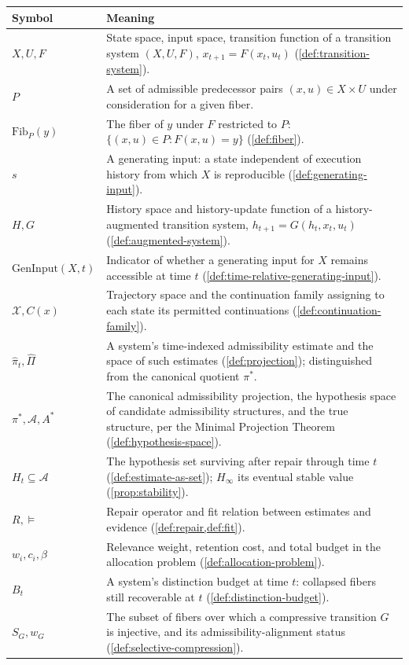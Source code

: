 \documentclass[11pt]{book}
\theoremstyle{plain}
\theoremstyle{definition}
\theoremstyle{remark}
\begin{document}
\begin{center}
\renewcommand{\arraystretch}{1.3}
\begin{tabular}{p{2.6cm}p{9.2cm}}
\toprule
\textbf{Symbol} & \textbf{Meaning} \\
\midrule
$X, U, F$ & State space, input space, transition function of a
transition system $(X,U,F)$, $x_{t+1} = F(x_t,u_t)$
(\cref{def:transition-system}). \\
$P$ & A set of admissible predecessor pairs $(x,u) \in X \times U$
under consideration for a given fiber. \\
$\mathrm{Fib}_P(y)$ & The fiber of $y$ under $F$ restricted to $P$:
$\{(x,u) \in P : F(x,u) = y\}$ (\cref{def:fiber}). \\
$s$ & A generating input: a state independent of execution history
from which $X$ is reproducible (\cref{def:generating-input}). \\
$H, G$ & History space and history-update function of a
history-augmented transition system, $h_{t+1} = G(h_t,x_t,u_t)$
(\cref{def:augmented-system}). \\
$\mathrm{GenInput}(X,t)$ & Indicator of whether a generating input for
$X$ remains accessible at time $t$ (\cref{def:time-relative-generating-input}). \\
$\mathcal{X}, C(x)$ & Trajectory space and the continuation family
assigning to each state its permitted continuations
(\cref{def:continuation-family}). \\
$\hat\pi_t, \hat\Pi$ & A system's time-indexed admissibility estimate
and the space of such estimates (\cref{def:projection}); distinguished
from the canonical quotient $\pi^*$. \\
$\pi^*, \mathcal{A}, A^*$ & The canonical admissibility projection, the
hypothesis space of candidate admissibility structures, and the true
structure, per the Minimal Projection Theorem
(\cref{def:hypothesis-space}). \\
$H_t \subseteq \mathcal{A}$ & The hypothesis set surviving after
repair through time $t$ (\cref{def:estimate-as-set}); $H_\infty$ its
eventual stable value (\cref{prop:stability}). \\
$R, \vDash$ & Repair operator and fit relation between estimates and
evidence (\cref{def:repair,def:fit}). \\
$w_i, c_i, \beta$ & Relevance weight, retention cost, and total budget
in the allocation problem (\cref{def:allocation-problem}). \\
$B_t$ & A system's distinction budget at time $t$: collapsed fibers
still recoverable at $t$ (\cref{def:distinction-budget}). \\
$S_G, w_G$ & The subset of fibers over which a compressive transition
$G$ is injective, and its admissibility-alignment status
(\cref{def:selective-compression}). \\
\bottomrule
\end{tabular}
\end{center}
\end{document}
